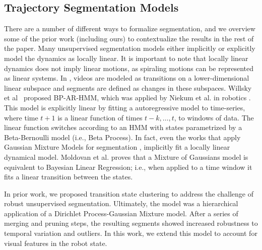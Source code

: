 \documentclass[0-main.tex]{subfiles}
\begin{document}
\subsection{Trajectory Segmentation Models}
There are a number of different ways to formalize segmentation, and we overview some of the prior work (including ours) to contextualize the results in the rest of the paper.
Many unsupervised segmentation models either implicitly or explicitly model the dynamics as locally linear.
It is important to note that locally linear dynamics does not imply linear motions, as spiraling motions can be represented as linear systems. 
In \cite{elhamifar2009sparse}, videos are modeled as transitions on a lower-dimensional linear subspace and segments are defined as changes in these subspaces.
Willsky et al~\cite{willsky2009sharing} proposed BP-AR-HMM, which was applied by Niekum et al. in robotics \cite{niekum2012learning}.
This model is explicitly linear by fitting a autoregressive model to time-series, where time $t+1$ is a linear function of times $t-k,\ldots, t$, to windows of data. 
The linear function switches according to an HMM with states parametrized by a Beta-Bernoulli model (i.e., Beta Process). 
In fact, even the works that apply Gaussian Mixture Models for segmentation \cite{calinon2010learning, lee2015autonomous, kruger2012imitation}, implicitly fit a locally linear dynamical model.
Moldovan et al. \cite{moldovan2013dirichlet} proves that a Mixture of Gaussians model is equivalent to Bayesian Linear Regression; i.e., when applied to a time window it fits a linear transition between the states.

In prior work, we proposed transition state clustering \cite{krishnan2015tsc} to address the challenge of robust unsupervised segmentation.
Ultimately, the model was a hierarchical application of a Dirichlet Process-Gaussian Mixture model.
After a series of merging and pruning steps, the resulting segments showed increased robustness to temporal variation and outliers.
In this work, we extend this model to account for visual features in the robot state.
\end{document}
